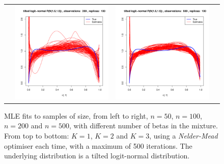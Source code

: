 \begin{figure}[h]
\begin{tabular}{cccc}
	&
	\includegraphics[width=\textwidth/4]{../img/logitnormal/tilted/K3/densities/n200_R100.pdf}
	&
	\includegraphics[width=\textwidth/4]{../img/logitnormal/tilted/K3/densities/n500_R100.pdf}\\
	
\end{tabular}
\caption{MLE fits to samples of size, from left to right, $n=50$, $n=100$, $n=200$ and $n=500$, with different number of betas in the mixture. From top to bottom: $K=1$, $K=2$ and $K=3$, using a \textit{Nelder-Mead} optimiser each time, with a maximum of 500 iterations. The underlying distribution is a tilted logit-normal distribution.}
\label{fig:logitnormal_fits}
\end{figure}





